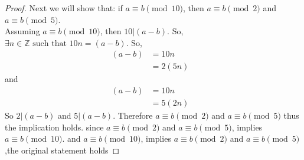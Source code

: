 \documentclass{article}
\newcommand{\ints}{\mathbb{Z}}
\newcommand{\st}{\text{ such that }}
\begin{document}
\begin{enumerate}
\begin{proof}
			Next we will show that: if $a \equiv b \pmod{10}$, then  $a \equiv b \pmod{2}$ and $a \equiv b \pmod{5}$.\\
			Assuming $a \equiv b \pmod{10}$, then $10|(a-b)$. So, $\exists n \in \ints \st 10n=(a-b)$. 
			So, 
			\begin{align*}
				(a-b) &= 10n &\\
					  &= 2(5n)
			\end{align*}
			and 
			\begin{align*}
				(a-b) &= 10n&\\
				 	  &= 5(2n)
			\end{align*}
			So $2|(a-b)$ and $5|(a-b)$. Therefore $a \equiv b \pmod{2}$ and $a \equiv b \pmod{5}$ thus the  implication holds. 
			since $a \equiv b \pmod{2}$ and $a \equiv b \pmod{5}$, implies  $a \equiv b \pmod{10}$. and 
		$a \equiv b \pmod{10}$, implies  $a \equiv b \pmod{2}$ and $a \equiv b \pmod{5}$,the  original statement holds
		\end{proof}
	\end{enumerate}
\end{document}
